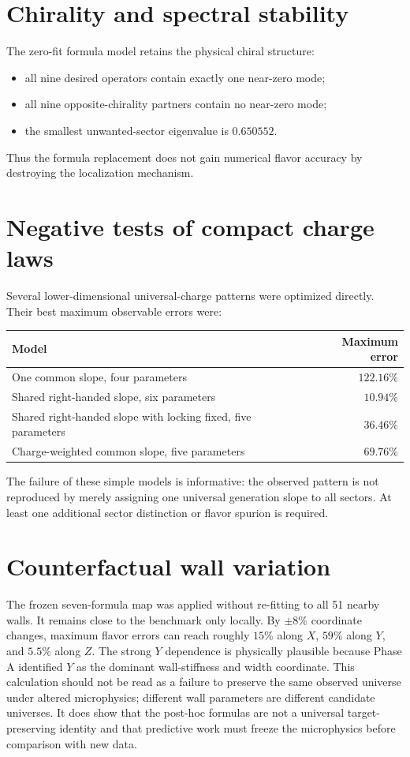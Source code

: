 \documentclass[11pt]{article}
\begin{document}
\section{Chirality and spectral stability}
The zero-fit formula model retains the physical chiral structure:
\begin{itemize}
\item all nine desired operators contain exactly one near-zero mode;
\item all nine opposite-chirality partners contain no near-zero mode;
\item the smallest unwanted-sector eigenvalue is $0.650552$.
\end{itemize}
Thus the formula replacement does not gain numerical flavor accuracy by destroying the localization mechanism.

\section{Negative tests of compact charge laws}
Several lower-dimensional universal-charge patterns were optimized directly.  Their best maximum observable errors were:
\begin{center}
\begin{tabular}{lr}
\toprule
Model & Maximum error\\
\midrule
One common slope, four parameters & $122.16\%$\\
Shared right-handed slope, six parameters & $10.94\%$\\
Shared right-handed slope with locking fixed, five parameters & $36.46\%$\\
Charge-weighted common slope, five parameters & $69.76\%$\\
\bottomrule
\end{tabular}
\end{center}
The failure of these simple models is informative: the observed pattern is not reproduced by merely assigning one universal generation slope to all sectors.  At least one additional sector distinction or flavor spurion is required.

\section{Counterfactual wall variation}
The frozen seven-formula map was applied without re-fitting to all 51 nearby walls.  It remains close to the benchmark only locally.  By $\pm8\%$ coordinate changes, maximum flavor errors can reach roughly $15\%$ along $X$, $59\%$ along $Y$, and $5.5\%$ along $Z$.  The strong $Y$ dependence is physically plausible because Phase A identified $Y$ as the dominant wall-stiffness and width coordinate.  This calculation should not be read as a failure to preserve the same observed universe under altered microphysics; different wall parameters are different candidate universes.  It does show that the post-hoc formulas are not a universal target-preserving identity and that predictive work must freeze the microphysics before comparison with new data.
\end{document}
